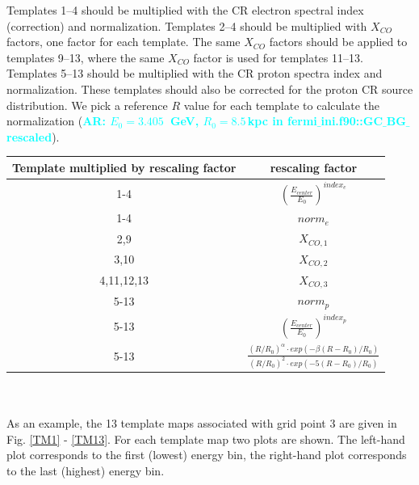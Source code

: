 \documentclass{article}
\newcommand{\ar}[1]{\textcolor{cyan}{{\bf AR: #1}}}
\begin{document}
   Templates 1--4 should be multiplied with the CR electron spectral index
   (correction) and normalization.  Templates 2--4 should be multiplied with
   $X_{CO}$ factors, one factor for each template.  The same $X_{CO}$ factors
   should be applied to templates 9--13, where the same $X_{CO}$ factor is
   used for templates 11--13.  Templates 5--13 should be multiplied with the CR proton spectra index and
   normalization.  These templates should also be corrected for the proton CR
   source distribution.  We pick a reference $R$ value for each template to calculate the normalization (\ar{$E_{0} = 3.405$\ GeV, $R_{0} = 8.5$\,kpc in fermi$\_$ini.f90::GC$\_$BG$\_$rescaled}).

\begin{tabular}[h]{c|c}
\hline
Template multiplied by rescaling factor & rescaling factor \\
\hline
1-4 & $\left(\frac{E_{center}}{E_{0}}\right)^{index_e}$ \\
1-4 & $norm_e$ \\
2,9 & $X_{CO,1}$ \\
3,10 & $X_{CO,2}$ \\
4,11,12,13 & $X_{CO,3}$ \\
5-13 & $norm_p$ \\
5-13 & $\left(\frac{E_{center}}{E_{0}}\right)^{index_p}$ \\
5-13 & $\frac{(R/R_{0})^{\alpha} \cdot exp(- \beta (R-R_{0})/R_{0}) }{(R/R_{0})^{2} \cdot exp(- 5 (R-R_{0})/R_{0}) }$ \\
\end{tabular} \\
\\
As an example, the 13 template maps associated with grid point 3 are given in Fig. \ref{TM1} - \ref{TM13}. For each template map two plots are shown. The left-hand plot corresponds to the first (lowest) energy bin, the right-hand plot corresponds to the last (highest) energy bin.
\end{document}
